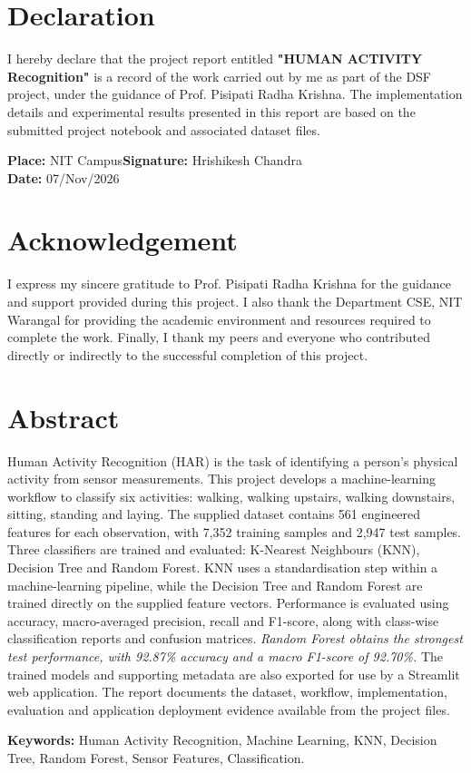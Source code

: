 \chapter*{Declaration}
I hereby declare that the project report entitled \textbf{"HUMAN ACTIVITY Recognition"} 
is a record of the work carried out by me 
as part of the DSF project, 
under the guidance of Prof. Pisipati Radha Krishna. The implementation details and experimental results presented in this report are based on the submitted project notebook and associated dataset files.

\vspace{1.5cm}
\textbf{Place:} NIT Campus\hfill \textbf{Signature:} Hrishikesh Chandra\\
\textbf{Date:} 07/Nov/2026

\chapter*{Acknowledgement}
I express my sincere 
gratitude to Prof. Pisipati Radha Krishna for the 
guidance and support 
provided during this project. 
I also thank the Department CSE, NIT Warangal 
for providing the academic environment 
and resources required to complete the work. 
Finally, I thank my peers and everyone who 
contributed directly or indirectly to the 
successful completion of this project.

\chapter*{Abstract}
Human Activity Recognition (HAR) is the task of identifying a person's physical activity from sensor measurements. This project develops a machine-learning workflow to classify six activities: walking, walking upstairs, walking downstairs, sitting, standing and laying. The supplied dataset contains 561 engineered features for each observation, with 7,352 training samples and 2,947 test samples. Three classifiers are trained and evaluated: K-Nearest Neighbours (KNN), Decision Tree and Random Forest. KNN uses a standardisation step within a machine-learning pipeline, while the Decision Tree and Random Forest are trained directly on the supplied feature vectors. Performance is evaluated using accuracy, macro-averaged precision, recall and F1-score, along with class-wise classification reports and confusion matrices. \emph{Random Forest obtains the strongest test performance, with 92.87\% accuracy and a macro F1-score of 92.70\%.} The trained models and supporting metadata are also exported for use by a Streamlit web application. The report documents the dataset, workflow, implementation, evaluation and application deployment evidence available from the project files.

\textbf{Keywords:} Human Activity Recognition, Machine Learning, KNN, Decision Tree, Random Forest, Sensor Features, Classification.
